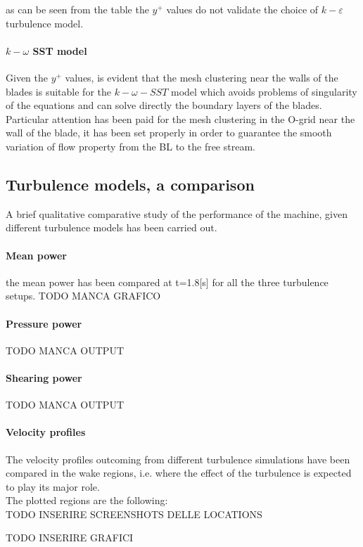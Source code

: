 \documentclass[a4paper,12pt]{article}
\newcommand{\todo}{\colorbox{cyan!60}{TODO}}
\begin{document}
as can be seen from the table the $y^+ $ values do not validate the choice of $k-\varepsilon$ turbulence model.\\

\paragraph{$k-\omega $ SST model}
Given the $y^+$ values, is evident that the mesh clustering near the walls of the blades is suitable for the $k-\omega-SST$ model which avoids problems of singularity of the equations and can solve directly the boundary layers of the blades.\\
Particular attention has been paid for the mesh clustering in the O-grid near the wall of the blade, it has been set properly in order to guarantee the smooth variation of flow property from the BL to the free stream.

\subsection{Turbulence models, a comparison}
A brief qualitative comparative study of the performance of the machine, given different turbulence models has been carried out.
\paragraph{Mean power}
the mean power has been compared at t=1.8[s] for all the three turbulence setups. 
\todo{} MANCA GRAFICO
\paragraph{Pressure power}
\todo{} MANCA OUTPUT
\paragraph{Shearing power}
\todo{} MANCA OUTPUT
\paragraph{Velocity profiles}
The velocity profiles outcoming from different turbulence simulations have been compared in the wake regions, i.e. where the effect of the turbulence is expected to play its major role.\\
The plotted regions are the following:\\
\todo{} INSERIRE SCREENSHOTS DELLE LOCATIONS

\todo{} INSERIRE GRAFICI
\end{document}
